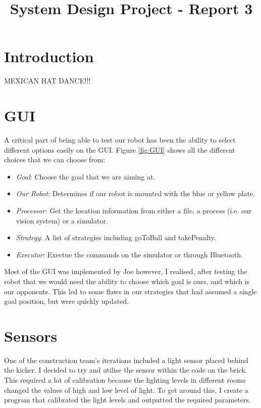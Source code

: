 \documentclass[conference,12pt]{IEEEtran}
\begin{document}
	
\title{\vspace{-0.05\textheight}System Design Project - Report 3}

\author{\vspace{-0.05\textheight}
}
	
\maketitle

\IEEEpeerreviewmaketitle

\section{Introduction}
MEXICAN HAT DANCE!!!
	
\section{GUI}
A critical part of being able to test our robot has been the ability to select different options easily on the GUI. Figure \ref{fig:GUI} shows all the different choices that we can choose from:
\begin{itemize}
 \item \textit{Goal}: Choose the goal that we are aiming at.
 \item \textit{Our Robot}: Determines if our robot is mounted with the blue or yellow plate.
 \item \textit{Processor}: Get the location information from either a file, a process (i.e. our vision system) or a simulator.
 \item \textit{Strategy}: A list of strategies including goToBall and takePenalty.
 \item \textit{Executor}: Exectue the commands on the simulator or through Bluetooth.
\end{itemize}
Most of the GUI was implemented by Joe however, I realised, after testing the robot that we would need the ability to choose which goal is ours, and which is our opponents. This led to some flaws in our strategies that had assumed a single goal position, but were quickly updated.

\section{Sensors}
One of the construction team's iterations included a light sensor placed behind the kicker. I decided to try and utilise the sensor within the code on the brick. This required a lot of calibration because the lighting levels in different rooms changed the values of high and low level of light. To get around this, I create a program that calibrated the light levels and outputted the required parameters.
\end{document}
